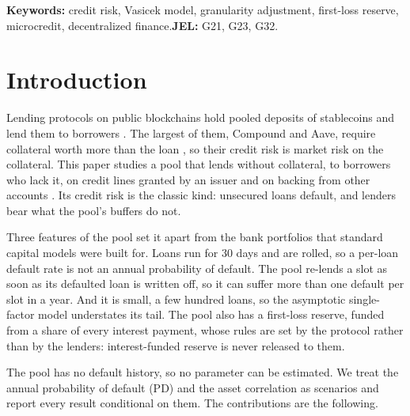 \documentclass[11pt]{article}
\theoremstyle{plain}
\theoremstyle{definition}
\begin{document}
\medskip
\noindent\textbf{Keywords:} credit risk, Vasicek model, granularity adjustment, first-loss reserve,
microcredit, decentralized finance.\quad \textbf{JEL:} G21, G23, G32.

\section{Introduction}

Lending protocols on public blockchains hold pooled deposits of stablecoins and lend them to
borrowers \citep{gudgeon2020}. The largest of them, Compound and Aave, require collateral worth more
than the loan \citep{leshner2019compound,aave2020}, so their credit risk is market risk on the collateral. This
paper studies a pool that lends without collateral, to borrowers who lack it, on credit lines granted
by an issuer and on backing from other accounts \citep{conservedcredit2026}. Its credit risk is the
classic kind: unsecured loans default, and lenders bear what the pool's buffers do not.

Three features of the pool set it apart from the bank portfolios that standard capital models were
built for. Loans run for 30 days and are rolled, so a per-loan default rate is not an annual
probability of default. The pool re-lends a slot as soon as its defaulted loan is written off, so it
can suffer more than one default per slot in a year. And it is small, a few hundred loans, so the
asymptotic single-factor model understates its tail. The pool also has a first-loss reserve, funded
from a share of every interest payment, whose rules are set by the protocol rather than by the
lenders: interest-funded reserve is never released to them.

The pool has no default history, so no parameter can be estimated. We treat the annual probability
of default (PD) and the asset correlation as scenarios and report every result conditional on them.
The contributions are the following.
\end{document}
